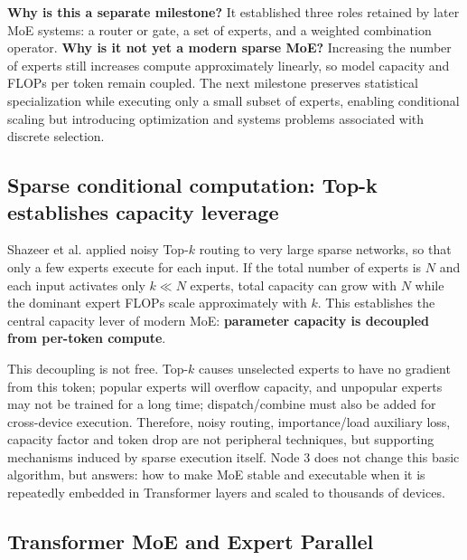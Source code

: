 \documentclass[10pt,a4paper,fontset=none]{ctexart}
\newcommand{\term}[1]{\textbf{#1}}
\begin{document}
\textbf{Why is this a separate milestone?} It established three roles retained by later MoE systems: a router or gate, a set of experts, and a weighted combination operator. \textbf{Why is it not yet a modern sparse MoE?} Increasing the number of experts still increases compute approximately linearly, so model capacity and FLOPs per token remain coupled. The next milestone preserves statistical specialization while executing only a small subset of experts, enabling conditional scaling but introducing optimization and systems problems associated with discrete selection.

\subsection{Sparse conditional computation: Top-k establishes capacity leverage}

Shazeer et al. applied noisy Top-$k$ routing to very large sparse networks\cite{shazeer2017outrageously}, so that only a few experts execute for each input. If the total number of experts is $N$ and each input activates only $k\ll N$ experts, total capacity can grow with $N$ while the dominant expert FLOPs scale approximately with $k$. This establishes the central capacity lever of modern MoE: \term{parameter capacity is decoupled from per-token compute}.

This decoupling is not free. Top-$k$ causes unselected experts to have no gradient from this token; popular experts will overflow capacity, and unpopular experts may not be trained for a long time; dispatch/combine must also be added for cross-device execution. Therefore, noisy routing, importance/load auxiliary loss, capacity factor and token drop are not peripheral techniques, but supporting mechanisms induced by sparse execution itself. Node 3 does not change this basic algorithm, but answers: how to make MoE stable and executable when it is repeatedly embedded in Transformer layers and scaled to thousands of devices.

\subsection{Transformer MoE and Expert Parallel}
\end{document}
